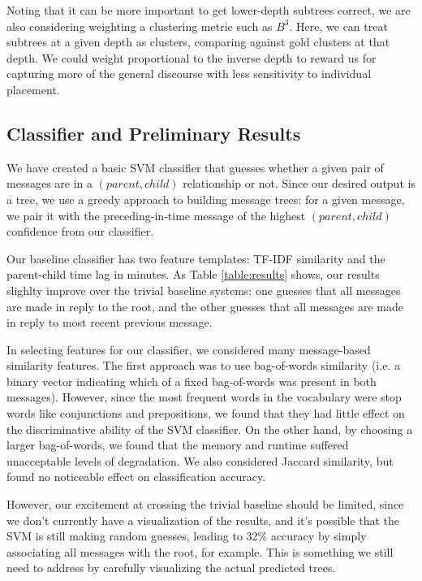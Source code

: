 \documentclass[10pt]{article}
\begin{document}
Noting that it can be more important to get lower-depth subtrees correct, we
are also considering weighting a clustering metric such as $B^3$. Here, we can
treat subtrees at a given depth as clusters, comparing against gold clusters at
that depth. We could weight proportional to the inverse depth to reward us for
capturing more of the general discourse with less sensitivity to individual placement.

\subsection{Classifier and Preliminary Results}
\label{sec:classifier}
We have created a basic SVM classifier that guesses whether a given pair of messages are in a $(parent, child)$
relationship or not. Since our desired output is a tree, we use a greedy approach
to building message trees: for a given message, we pair it with the preceding-in-time 
message of the highest $(parent, child)$ confidence from our classifier.

Our baseline classifier has two feature templates: TF-IDF similarity and the parent-child time lag in minutes. As Table \ref{table:results} shows, 
our results slighlty improve over the trivial baseline systems: one guesses that all messages are made in reply to the root, and the
other guesses that all messages are made in reply to most recent previous message.

In selecting features for our classifier, we considered many message-based
similarity features. The first approach was to use bag-of-words similarity
(i.e. a binary vector indicating which of a fixed bag-of-words was present in
both messages). However, since the most frequent words in the vocabulary were
stop words like conjunctions and prepositions, we found that they had little
effect on the discriminative ability of the SVM classifier. On the other hand,
by choosing a larger bag-of-words, we found that the memory and runtime
suffered unacceptable levels of degradation. We also considered Jaccard similarity, 
but found no noticeable effect on classification accuracy.

However, our excitement at crossing the trivial baseline should be limited, since 
we don't currently have a visualization of the results, and it's possible that the 
SVM is still making random guesses, leading to 32\% accuracy by simply associating 
all messages with the root, for example. This is something we still need to address 
by carefully visualizing the actual predicted trees.
\end{document}
